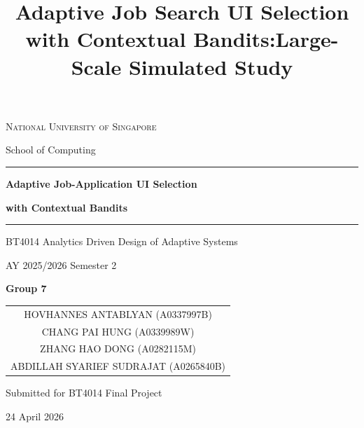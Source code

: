 \documentclass[10pt,twocolumn]{article}
\title{Adaptive Job Search UI Selection with Contextual Bandits:\A Large-Scale Simulated Study}
\author{}
\date{}
\begin{document}
\begin{titlepage}
    \centering
    \vspace*{0.8cm}

    {\Large\scshape National University of Singapore\par}
    \vspace{0.15cm}
    {\large School of Computing\par}

    \vspace{1.0cm}
    \rule{0.82\textwidth}{0.8pt}\par
    \vspace{0.6cm}

    {\Huge\bfseries Adaptive Job-Application UI Selection\par}
    \vspace{0.25cm}
    {\Huge\bfseries with Contextual Bandits\par}

    \vspace{0.7cm}
    \rule{0.82\textwidth}{0.8pt}\par

    \vspace{1.0cm}

    {\Large BT4014 Analytics Driven Design of Adaptive Systems\par}
    \vspace{0.2cm}
    {\Large AY 2025/2026 Semester 2\par}

    \vspace{0.9cm}
    {\LARGE\bfseries Group 7\par}

    \vspace{1.0cm}

    {\large
    \begin{tabular}{c}
    HOVHANNES ANTABLYAN (A0337997B)\\[0.18cm]
    CHANG PAI HUNG (A0339989W)\\[0.18cm]
    ZHANG HAO DONG (A0282115M)\\[0.18cm]
    ABDILLAH SYARIEF SUDRAJAT (A0265840B)
    \end{tabular}\par}

    \vfill

    {\large Submitted for BT4014 Final Project\par}
    \vspace{0.2cm}
    {\large 24 April 2026\par}

\end{titlepage}
\end{document}
